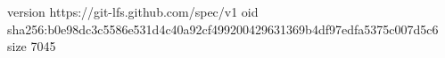 version https://git-lfs.github.com/spec/v1
oid sha256:b0e98dc3c5586e531d4c40a92cf499200429631369b4df97edfa5375c007d5c6
size 7045
